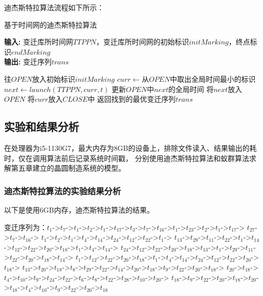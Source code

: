 迪杰斯特拉算法流程如下所示：

\begin{algorithm}[H]
    \caption{基于时间网的迪杰斯特拉算法}
    \hspace*{0.02in} {\bf 输入:} 
    变迁库所时间网$TTPPN$，变迁库所时间网的初始标识$initMarking$，终点标识$endMarking$\\
    \hspace*{0.02in} {\bf 输出:}
	变迁序列$trans$
    \begin{algorithmic}[1]
			\State 往$OPEN$放入初始标识$initMarking$
				\State $curr \leftarrow$从$OPEN$中取出全局时间最小的标识
					\State $next \leftarrow launch(TTPPN,curr,t)$
						\State 更新$OPEN$中$next$的全局时间
					\EndIf
					\State 将$next$放入$OPEN$
					\EndIf
				\EndFor
				\State 将$curr$放入$CLOSE$中
			\EndWhile
		\EndFor
		\State 返回找到的最优变迁序列$trans$
    \end{algorithmic}
\end{algorithm}

\subsection{实验和结果分析}
在处理器为i5-1130G7，最大内存为8GB的设备上，排除文件读入、结果输出的耗时，仅在调用算法前后记录系统时间戳，
分别使用迪杰斯特拉算法和蚁群算法求解第五章建立的晶圆制造系统的模型。

\subsubsection{迪杰斯特拉算法的实验结果分析}
以下是使用6GB内存，迪杰斯特拉算法的结果。

变迁序列为：$t_{1}$->$t_{7}$->$t_{1}$->$t_{2}$->$t_{1}$->$t_{17}$->$t_{3}$->$t_{7}$->$t_{16}$->$t_{1}$->$t_{23}$->$t_{2}$->$t_{1}$->$t_{17}$->
$t_{27}$->$t_{7}$->$t_{16}$->	$t_{1}$->$t_{2}$->$t_{1}$->$t_{4}$->$t_{14}$->$t_{24}$->$t_{12}$->$t_{22}$->$t_{1}$->
$t_{13}$->$t_{29}$->$t_{11}$->$t_{22}$->$t_{1}$->$t_{14}$->$t_{12}$->$t_{22}$->$t_{20}$->$t_{18}$->$t_{1}$->$t_{4}$->$t_{14}$->
$t_{24}$->$t_{12}$->$t_{22}$->$t_{20}$->$t_{18}$->$t_{13}$->$t_{1}$->$t_{29}$->$t_{11}$->$t_{22}$->$t_{20}$->$t_{18}$->$t_{14}$->
$t_{1}$->$t_{12}$->$t_{22}$->$t_{20}$->$t_{18}$->$t_{1}$->$t_{4}$->$t_{14}$->$t_{24}$->$t_{12}$->$t_{22}$->$t_{20}$->$t_{18}$->
$t_{13}$->$t_{20}$->$t_{18}$->$t_{8}$->$t_{29}$->$t_{22}$->$t_{14}$->$t_{20}$->$t_{18}$->$t_{9}$->$t_{22}$->$t_{20}$->$t_{18}$->
$t_{20}$->$t_{18}$->$t_{4}$->$t_{10}$->$t_{9}$->$t_{24}$->$t_{22}$->$t_{6}$->$t_{8}$->$t_{22}$->$t_{28}$->$t_{10}$->$t_{20}$->
$t_{18}$->$t_{9}$->$t_{22}$->$t_{20}$->$t_{18}$->$t_{20}$->$t_{18}$->$t_{4}$->$t_{10}$->$t_{9}$->$t_{22}$->$t_{20}$->$t_{18}$

